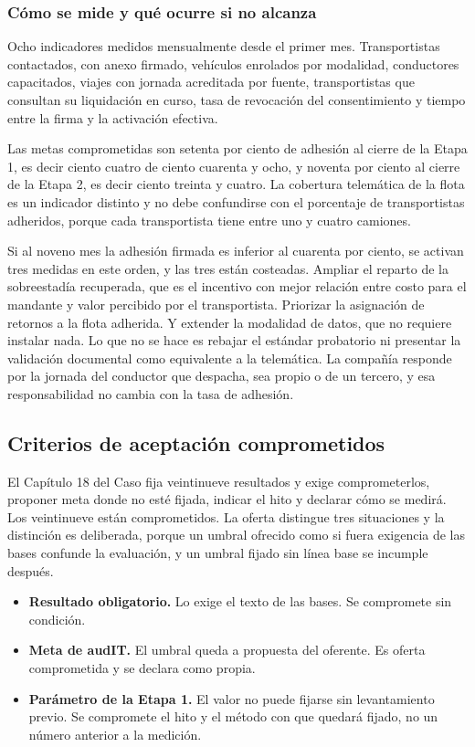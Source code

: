 \subsubsection{Cómo se mide y qué ocurre si no alcanza}

Ocho indicadores medidos mensualmente desde el primer mes. Transportistas contactados, con anexo
firmado, vehículos enrolados por modalidad, conductores capacitados, viajes con jornada acreditada
por fuente, transportistas que consultan su liquidación en curso, tasa de revocación del
consentimiento y tiempo entre la firma y la activación efectiva.

Las metas comprometidas son setenta por ciento de adhesión al cierre de la Etapa 1, es decir ciento
cuatro de ciento cuarenta y ocho, y noventa por ciento al cierre de la Etapa 2, es decir ciento
treinta y cuatro. La cobertura telemática de la flota es un indicador distinto y no debe
confundirse con el porcentaje de transportistas adheridos, porque cada transportista tiene entre
uno y cuatro camiones.

Si al noveno mes la adhesión firmada es inferior al cuarenta por ciento, se activan tres medidas en
este orden, y las tres están costeadas. Ampliar el reparto de la sobreestadía recuperada, que es el
incentivo con mejor relación entre costo para el mandante y valor percibido por el transportista.
Priorizar la asignación de retornos a la flota adherida. Y extender la modalidad de datos, que no
requiere instalar nada. Lo que no se hace es rebajar el estándar probatorio ni presentar la
validación documental como equivalente a la telemática. La compañía responde por la jornada del
conductor que despacha, sea propio o de un tercero, y esa responsabilidad no cambia con la tasa de
adhesión.

\subsection{Criterios de aceptación comprometidos}

El Capítulo 18 del Caso fija veintinueve resultados y exige comprometerlos, proponer meta donde no
esté fijada, indicar el hito y declarar cómo se medirá. Los veintinueve están comprometidos. La
oferta distingue tres situaciones y la distinción es deliberada, porque un umbral ofrecido como si
fuera exigencia de las bases confunde la evaluación, y un umbral fijado sin línea base se incumple
después.

\begin{itemize}
    \item \textbf{Resultado obligatorio.} Lo exige el texto de las bases. Se compromete sin condición.
    \item \textbf{Meta de audIT.} El umbral queda a propuesta del oferente. Es oferta comprometida y se declara como propia.
    \item \textbf{Parámetro de la Etapa 1.} El valor no puede fijarse sin levantamiento previo. Se compromete el hito y el método con que quedará fijado, no un número anterior a la medición.
\end{itemize}

